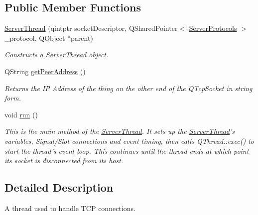 \subsection*{Public Member Functions}
\begin{DoxyCompactItemize}
\item 
\hyperlink{class_server_thread_a8dcd310ae86f874d03ec263ed6db78ac}{Server\-Thread} (qintptr socket\-Descriptor, Q\-Shared\-Pointer$<$ \hyperlink{struct_server_protocols}{Server\-Protocols} $>$ \-\_\-protocol, Q\-Object $\ast$parent)
\begin{DoxyCompactList}\small\item\em Constructs a \hyperlink{class_server_thread}{Server\-Thread} object. \end{DoxyCompactList}\item 
\hypertarget{class_server_thread_a456352f01a609e528345b109ee5e303f}{Q\-String \hyperlink{class_server_thread_a456352f01a609e528345b109ee5e303f}{get\-Peer\-Address} ()}\label{class_server_thread_a456352f01a609e528345b109ee5e303f}

\begin{DoxyCompactList}\small\item\em Returns the I\-P Address of the thing on the other end of the Q\-Tcp\-Socket in string form. \end{DoxyCompactList}\item 
\hypertarget{class_server_thread_add169bf62322681e6e124d0452579dee}{void \hyperlink{class_server_thread_add169bf62322681e6e124d0452579dee}{run} ()}\label{class_server_thread_add169bf62322681e6e124d0452579dee}

\begin{DoxyCompactList}\small\item\em This is the main method of the \hyperlink{class_server_thread}{Server\-Thread}. It sets up the \hyperlink{class_server_thread}{Server\-Thread}'s variables, Signal/\-Slot connections and event timing, then calls Q\-Thread\-::exec() to start the thread's event loop. This continues until the thread ends at which point its socket is disconnected from its host. \end{DoxyCompactList}\end{DoxyCompactItemize}


\subsection{Detailed Description}
A thread used to handle T\-C\-P connections. 

